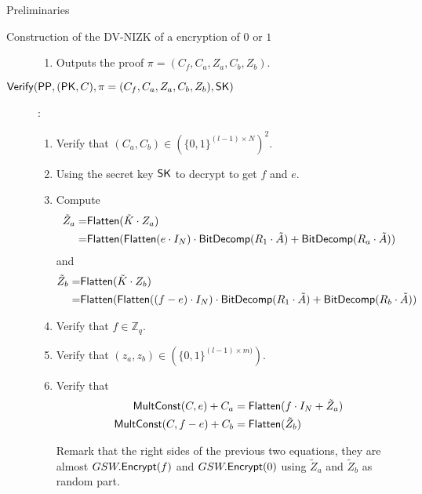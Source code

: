 \begin{section}{Preliminaries}
\begin{subsection}{Construction of the DV-NIZK of a encryption of $0$ or $1$}
\begin{description}
\begin{enumerate}
        \item Outputs the proof $\pi = (C_f, C_a, Z_a, C_b, Z_b)$.
          

        \end{enumerate}

      \item[${\mathsf{Verify}}({\mathsf{PP}}, (\mathsf{PK}, C), \pi = (C_f, C_a, Z_a, C_b, Z_b), \mathsf{SK})$]:
        \begin{enumerate}
        \item Verify that $(C_a, C_b) \in (\{0,1\}^{(l-1) \times N})^2$.
        \item Using the secret key $\mathsf{SK}$ to decrypt to get $f$ and $e$.
        \item Compute
          \begin{align*}
            \tilde{Z}_a = & {\mathsf{Flatten}}(\tilde{K} \cdot Z_a)\\
            = &{\mathsf{Flatten}}({\mathsf{Flatten}}(e \cdot I_N) \cdot {\mathsf{BitDecomp}}(R_1 \cdot \tilde{A}) + {\mathsf{BitDecomp}}(R_a \cdot \tilde{A}))
          \end{align*}
          and
          \begin{align*}
            \tilde{Z}_b = & {\mathsf{Flatten}}(\tilde{K} \cdot Z_b)\\
            = &{\mathsf{Flatten}}({\mathsf{Flatten}}((f-e) \cdot I_N) \cdot {\mathsf{BitDecomp}}(R_1 \cdot \tilde{A}) + {\mathsf{BitDecomp}}(R_b \cdot \tilde{A}))
          \end{align*}

        \item Verify that $f \in \mathbb{Z}_q$.
        \item Verify that $(z_a, z_b) \in  (\{0,1\}^{(l-1) \times m)})$.
        \item Verify that
          \begin{align*}
            {\mathsf{MultConst}}(C, e) + C_a &= {\mathsf{Flatten}}(f \cdot I_N + \tilde{Z}_a)\\
            {\mathsf{MultConst}}(C, f-e) + C_b &= {\mathsf{Flatten}}(\tilde{Z}_b)
          \end{align*}

          Remark that the right sides of the previous two equations, they are almost $GSW.{\mathsf{Encrypt}}(f)$ and $GSW.{\mathsf{Encrypt}}(0)$ using $\tilde{Z}_a$ and $\tilde{Z}_b$ as random part.
        \end{enumerate}

        
        
    \end{description}


    
    

\end{subsection}
\end{section}
